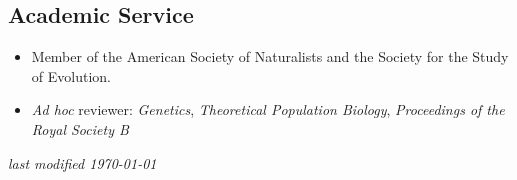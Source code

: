 \documentclass[overlapped,line,letterpaper]{res}
\begin{document}
\begin{resume}

\section{\bf \large Academic Service}
\begin{itemize}[$\ast$]
\item Member of the American Society of Naturalists and the Society for the Study of Evolution.
\item \textit{Ad hoc} reviewer: \textit{Genetics}, \textit{Theoretical Population Biology}, \textit{Proceedings of the Royal Society B} 
\end{itemize}


\begin{center} 
\vspace{\fill}
\small \it last modified \today
\end{center}

\end{resume}
\end{document}
